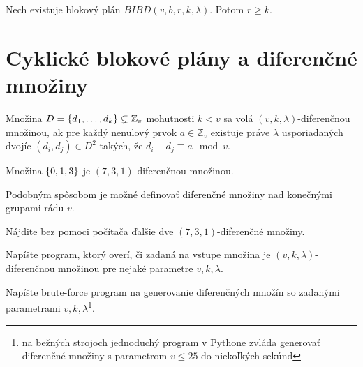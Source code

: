 \begin{corollary}
Nech existuje blokový plán $BIBD(v, b,r, k, \lambda)$. Potom $r \geq k$.
\end{corollary}

\section{Cyklické blokové plány a diferenčné množiny}

\begin{definition}

Množina $D = \left\{d_1, \ldots, d_k\right\} \subsetneq \mathbb{Z}_v$ mohutnosti $k < v$ sa volá $(v, k, \lambda)$-diferenčnou množinou, ak 
pre každý nenulový prvok $a \in \mathbb{Z}_v$ existuje práve $\lambda$ usporiadaných dvojíc $(d_i, d_j) \in D^2$ takých, že
$d_i - d_j \equiv a \mod v$. 
\end{definition}

\begin{remark}

Množina $\left\{0, 1, 3\right\}$ je $(7, 3, 1)$-diferenčnou množinou.

\end{remark}

\begin{remark}

Podobným spôsobom je možné definovať diferenčné množiny nad konečnými grupami rádu $v$.

\end{remark}


\begin{toreview}
\begin{exercise}
Nájdite bez pomoci počítača ďalšie dve $(7, 3, 1)$-diferenčné množiny.
\end{exercise}

\begin{exercise}
Napíšte program, ktorý overí, či zadaná na vstupe množina je $(v, k, \lambda)$-diferenčnou množinou pre nejaké parametre $v, k, \lambda$.
\end{exercise}

\begin{exercise}
Napíšte brute-force program na generovanie diferenčných množín so zadanými parametrami $v, k, \lambda$\footnote{na bežných strojoch jednoduchý program v Pythone zvláda generovať diferenčné množiny s parametrom $ v \leq 25$ do niekoľkých sekúnd}.
\end{exercise}
\end{toreview}

